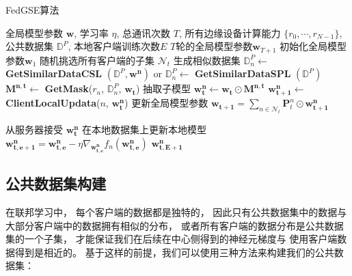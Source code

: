 \begin{algorithm}[thbp]
    \caption{FedGSE算法}
    \label{alg:fedgse}
    \begin{algorithmic}[1]
    \Require 全局模型参数 $\mathbf{w}$,
            学习率 $\eta$, 总通讯次数 $T$, 
            所有边缘设备计算能力 $\{r_0, \cdots,r_{N-1}\}$, 
            公共数据集 $\mathbb{D}^P$,
            本地客户端训练次数$E$
    \Ensure $T$轮的全局模型参数$\mathbf{w}_{T+1}$
    \State 初始化全局模型参数$\mathbf{w}_1$
      {}
            \State 随机挑选所有客户端的子集 $\mathcal{N}_t$
                \State 生成相似数据集 $\mathbb{D}^P_n \leftarrow$ \textbf{GetSimilarDataCSL} $(\mathbb{D}^P,\mathbf{w^n})$  or  $\mathbb{D}^P_n \leftarrow$ \textbf{GetSimilarDataSPL} $(\mathbb{D}^P)$  
                \State $\mathbf{M^{n,t}} \leftarrow$ \textbf{GetMask}($r_n$, $\mathbb{D}^P_n$, $\mathbf{w_{t}}$)
                \State 抽取子模型 $\mathbf{w^n_t} \leftarrow \mathbf{w_t} \odot \mathbf{M^{n,t}}$
                \State $\mathbf{w^n_{t+1}} \leftarrow$ \textbf{ClientLocalUpdata}($n$, $\mathbf{w^n_t}$)
            \EndFor
            \State 更新全局模型参数 $\mathbf{w_{t+1}} = \sum_{n \in \mathcal{N}_t} \mathbf{P}^n_t \odot \mathbf{w^n_{t+1}} $
        \EndFor
    \EndProcedure
    
        \State 从服务器接受 $\mathbf{w_t^n}$
            \State 在本地数据集上更新本地模型 $\mathbf{w^n_{t,e+1}} = \mathbf{w^n_{t,e}} - \eta \nabla_{\mathbf{w^n_{t,e}}} f_n(\mathbf{w^n_{t,e}})$
        \EndFor
        \State \Return $\mathbf{w^n_{t,E+1}}$
    \EndProcedure
    \end{algorithmic}
\end{algorithm}

\subsection{公共数据集构建}
在联邦学习中，
每个客户端的数据都是独特的，
因此只有公共数据集中的数据与大部分客户端中的数据拥有相似的分布，
或者所有客户端的数据分布是公共数据集的一个子集，
才能保证我们在后续在中心侧得到的神经元梯度与
使用客户端数据得到是相近的。
基于这样的前提，我们可以使用三种方法来构建我们的公共数据集：

